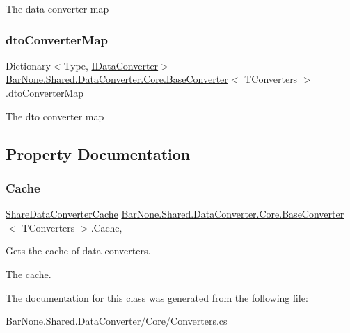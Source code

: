 The data converter map 

\mbox{\label{class_bar_none_1_1_shared_1_1_data_converter_1_1_core_1_1_base_converter_af3bc02b8dae539fdfabf1d1e3b12c16c}} 
\subsubsection{\texorpdfstring{dto\+Converter\+Map}{dtoConverterMap}}
{\footnotesize\ttfamily Dictionary$<$Type, \mbox{\hyperlink{interface_bar_none_1_1_shared_1_1_data_converter_1_1_core_1_1_i_data_converter}{I\+Data\+Converter}}$>$ \mbox{\hyperlink{class_bar_none_1_1_shared_1_1_data_converter_1_1_core_1_1_base_converter}{Bar\+None.\+Shared.\+Data\+Converter.\+Core.\+Base\+Converter}}$<$ T\+Converters $>$.dto\+Converter\+Map\hspace{0.3cm}{\ttfamily [private]}}



The dto converter map 



\subsection{Property Documentation}
\mbox{\label{class_bar_none_1_1_shared_1_1_data_converter_1_1_core_1_1_base_converter_a272d16077d3d7753fab1649b57288f5e}} 
\subsubsection{\texorpdfstring{Cache}{Cache}}
{\footnotesize\ttfamily \mbox{\hyperlink{class_bar_none_1_1_shared_1_1_data_converter_1_1_core_1_1_share_data_converter_cache}{Share\+Data\+Converter\+Cache}} \mbox{\hyperlink{class_bar_none_1_1_shared_1_1_data_converter_1_1_core_1_1_base_converter}{Bar\+None.\+Shared.\+Data\+Converter.\+Core.\+Base\+Converter}}$<$ T\+Converters $>$.Cache\hspace{0.3cm}{\ttfamily [get]}, {}}



Gets the cache of data converters. 

The cache. 

The documentation for this class was generated from the following file\+:\begin{DoxyCompactItemize}
\item 
Bar\+None.\+Shared.\+Data\+Converter/\+Core/Converters.\+cs\end{DoxyCompactItemize}
